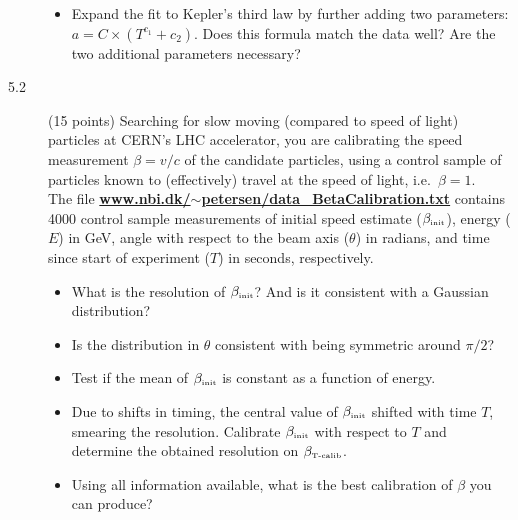 \documentclass[11pt]{article}
\begin{document}
\begin{description}
\begin{itemize}
    \item Expand the fit to Kepler's third law by further adding two parameters:
      $a = C \times (T^{c_1} + c_2)$. Does this formula match the data well?
      Are the two additional parameters necessary?
  \end{itemize}
\item[5.2] (15 points) 
  Searching for slow moving (compared to speed of light) particles at CERN's LHC accelerator, you are calibrating
  the speed measurement $\beta = v/c$ of the candidate particles, using a control sample of particles known to
  (effectively) travel at the speed of light, i.e.\ $\beta = 1$.\\
  The file
  \href{http://www.nbi.dk/~petersen/data\_BetaCalibration.txt}{\bf www.nbi.dk/$\sim$petersen/data\_BetaCalibration.txt}
  contains 4000 control sample measurements of initial speed estimate ($\beta_{\mbox{\tiny init}}$), energy ($E$) in GeV,
  angle with respect to the beam axis ($\theta$) in radians, and time since start of experiment ($T$) in seconds,
  respectively.
  \vspace{-1.0ex}
  \begin{itemize}
    \item What is the resolution of $\beta_{\mbox{\tiny init}}$? And is it consistent with a Gaussian distribution?
    \item Is the distribution in $\theta$ consistent with being symmetric around $\pi/2$?
    \item Test if the mean of $\beta_{\mbox{\tiny init}}$ is constant as a function of energy.
    \item Due to shifts in timing, the central value of $\beta_{\mbox{\tiny init}}$ shifted with time $T$,
      smearing the resolution. Calibrate $\beta_{\mbox{\tiny init}}$ with respect to $T$ and determine
      the obtained resolution on $\beta_{\mbox{\tiny T-calib}}$.
    \item Using all information available, what is the best calibration of $\beta$ you can produce?
  \end{itemize}
\vspace*{-2ex}
\end{description}


\end{document}
